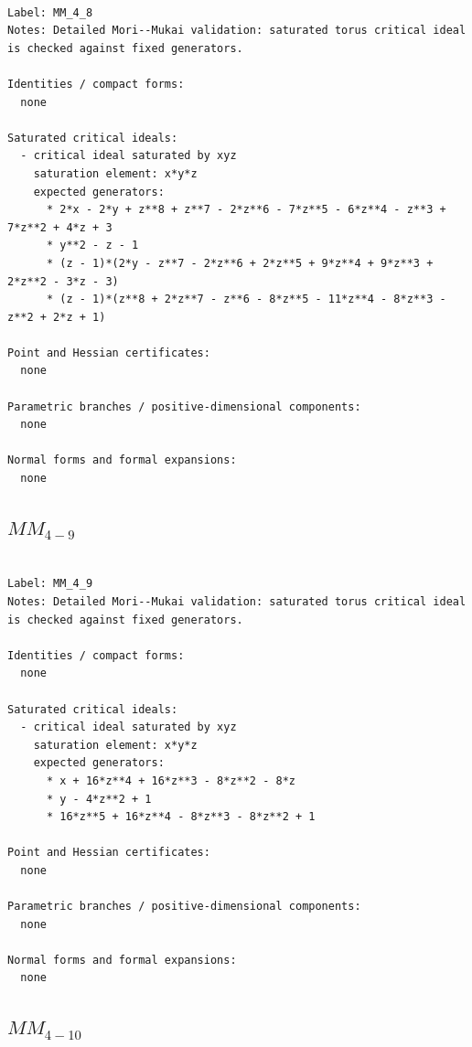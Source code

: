 \documentclass[10pt,a4paper]{article}
\begin{document}
\begin{lstlisting}

Label: MM_4_8
Notes: Detailed Mori--Mukai validation: saturated torus critical ideal is checked against fixed generators.

Identities / compact forms:
  none

Saturated critical ideals:
  - critical ideal saturated by xyz
    saturation element: x*y*z
    expected generators:
      * 2*x - 2*y + z**8 + z**7 - 2*z**6 - 7*z**5 - 6*z**4 - z**3 + 7*z**2 + 4*z + 3
      * y**2 - z - 1
      * (z - 1)*(2*y - z**7 - 2*z**6 + 2*z**5 + 9*z**4 + 9*z**3 + 2*z**2 - 3*z - 3)
      * (z - 1)*(z**8 + 2*z**7 - z**6 - 8*z**5 - 11*z**4 - 8*z**3 - z**2 + 2*z + 1)

Point and Hessian certificates:
  none

Parametric branches / positive-dimensional components:
  none

Normal forms and formal expansions:
  none

\end{lstlisting}

\subsection*{$ MM_{4-9} $}

\begin{lstlisting}

Label: MM_4_9
Notes: Detailed Mori--Mukai validation: saturated torus critical ideal is checked against fixed generators.

Identities / compact forms:
  none

Saturated critical ideals:
  - critical ideal saturated by xyz
    saturation element: x*y*z
    expected generators:
      * x + 16*z**4 + 16*z**3 - 8*z**2 - 8*z
      * y - 4*z**2 + 1
      * 16*z**5 + 16*z**4 - 8*z**3 - 8*z**2 + 1

Point and Hessian certificates:
  none

Parametric branches / positive-dimensional components:
  none

Normal forms and formal expansions:
  none

\end{lstlisting}

\subsection*{$ MM_{4-10} $}
\end{document}

